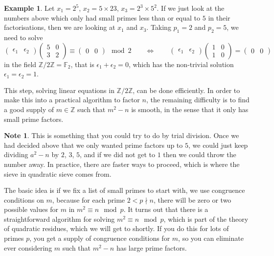 \documentclass{article}
\newcommand{\F}{\mathbb{F}}
\newcommand{\Z}{\mathbb{Z}}
\newcommand{\two}[2]{\begin{pmatrix} #1 \\ #2 \end{pmatrix}}
\theoremstyle{definition}\newtheorem{definition}{Definition}
\theoremstyle{definition}\newtheorem{remark}[definition]{Remark}
\theoremstyle{definition}\newtheorem*{example}{Example}
\theoremstyle{definition}\newtheorem*{note}{Note}
\begin{document}
\begin{example}
Let $ x_1 = 2^5 $, $ x_2 = 5 \times 23 $, $ x_3 = 2^3 \times 5^2 $. If we just look at the numbers above which only had small primes less than or equal to $ 5 $ in their factorisations, then we are looking at $ x_1 $ and $ x_3 $. Taking $ p_1 = 2 $ and $ p_2 = 5 $, we need to solve
$$ \begin{pmatrix} \epsilon_1 & \epsilon_2 \end{pmatrix} \two{5 & 0}{3 & 2} \equiv \begin{pmatrix} 0 & 0 \end{pmatrix} \mod 2 \qquad \iff \qquad \begin{pmatrix} \epsilon_1 & \epsilon_2 \end{pmatrix} \two{1 & 0}{1 & 0} = \begin{pmatrix} 0 & 0 \end{pmatrix} $$
in the field $ \Z / 2\Z = \F_2 $, that is $ \epsilon_1 + \epsilon_2 = 0 $, which has the non-trivial solution $ \epsilon_1 = \epsilon_2 = 1 $.
\end{example}

This step, solving linear equations in $ \Z / 2\Z $, can be done efficiently. In order to make this into a practical algorithm to factor $ n $, the remaining difficulty is to find a good supply of $ m \in \Z $ such that $ m^2 - n $ is smooth, in the sense that it only has small prime factors.

\begin{note}
This is something that you could try to do by trial division. Once we had decided above that we only wanted prime factors up to $ 5 $, we could just keep dividing $ a^2 - n $ by $ 2 $, $ 3 $, $ 5 $, and if we did not get to $ 1 $ then we could throw the number away. In practice, there are faster ways to proceed, which is where the sieve in quadratic sieve comes from.
\end{note}

The basic idea is if we fix a list of small primes to start with, we use congruence conditions on $ m $, because for each prime $ 2 < p \nmid n $, there will be zero or two possible values for $ m $ in $ m^2 \equiv n \mod p $. It turns out that there is a straightforward algorithm for solving $ m^2 \equiv n \mod p $, which is part of the theory of quadratic residues, which we will get to shortly. If you do this for lots of primes $ p $, you get a supply of congruence conditions for $ m $, so you can eliminate ever considering $ m $ such that $ m^2 - n $ has large prime factors.
\end{document}
